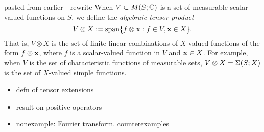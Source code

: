{\color{blue} pasted from earlier - rewrite
When $V \subset M(S;\mathbb{C})$ is a set of measurable scalar-valued functions on $S$, we define the \emph{algebraic tensor product}
\begin{equation*}
  V \otimes X := \mathrm{span}\{f \otimes \mathbf{x} : f \in V, \mathbf{x} \in X\}.
\end{equation*}
That is, $V \otimes X$ is the set of finite linear combinations of $X$-valued functions of the form $f \otimes \mathbf{x}$, where $f$ is a scalar-valued function in $V$ and $\mathbf{x} \in X$.
For example, when $V$ is the set of characteristic functions of measurable sets, $V \otimes X = \Sigma(S;X)$ is the set of $X$-valued simple functions.
}


\begin{itemize}
\item defn of tensor extensions
\item result on positive operators
\item nonexample: Fourier transform. counterexamples
\end{itemize}




